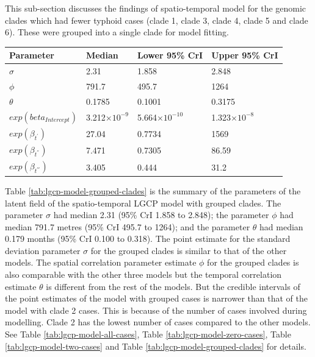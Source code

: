 This sub-section discusses the findings of spatio-temporal model for the genomic clades which had fewer typhoid cases (clade 1, clade 3, clade 4, clade 5 and clade 6). These were grouped into a single clade for model fitting.

\newpage

\hspace{0.5pt}

\addtocounter{table}{-1}
\begin{spacing}{0.9}
     \label{tab:lgcp-model-grouped-clades}
    \begin{longtable}{p{1.3in}p{1.3in}p{1.3in}p{1.3in}}
        \toprule
        Parameter               & Median               & Lower 95\% CrI        & Upper 95\% CrI       \\ \midrule
        $\sigma$                & 2.31                 & 1.858                 & 2.848                \\
        $\phi$                  & 791.7                & 495.7                 & 1264                 \\
        $\theta$                & 0.1785               & 0.1001                & 0.3175               \\
        $exp(beta_{Intercept})$ & 3.212$\times10^{-9}$ & 5.664$\times10^{-10}$ & 1.323$\times10^{-8}$ \\
        $exp(\beta_{t^{'}})$    & 27.04                & 0.7734                & 1569                 \\
        $exp(\beta_{t^{''}})$   & 7.471                & 0.7305                & 86.59                \\
        $exp(\beta_{t^{'''}})$  & 3.405                & 0.444                 & 31.2                 \\
        \bottomrule
    \end{longtable}
\end{spacing}

\hspace{0.2pt}

Table \ref{tab:lgcp-model-grouped-clades} is the summary of the parameters of the latent field of the spatio-temporal LGCP model with grouped clades. The parameter $\sigma$ had median 2.31 (95\% CrI 1.858 to 2.848); the parameter $\phi$ had median 791.7 metres (95\% CrI 495.7 to 1264); and the parameter $\theta$ had median 0.179 months (95\% CrI 0.100 to 0.318). The point estimate for the standard deviation parameter $\sigma$ for the grouped clades is similar to that of the other models. The spatial correlation parameter estimate $\phi$ for the grouped clades is also comparable with the other three models but the temporal correlation estimate $\theta$ is different from the rest of the models. But the credible intervals of the point estimates of the model with grouped cases is narrower than that of the model with clade 2 cases. This is because of the number of cases involved during modelling. Clade 2 has the lowest number of cases compared to the other models. See Table \ref{tab:lgcp-model-all-cases}, Table \ref{tab:lgcp-model-zero-cases}, Table \ref{tab:lgcp-model-two-cases} and Table \ref{tab:lgcp-model-grouped-clades} for details.

